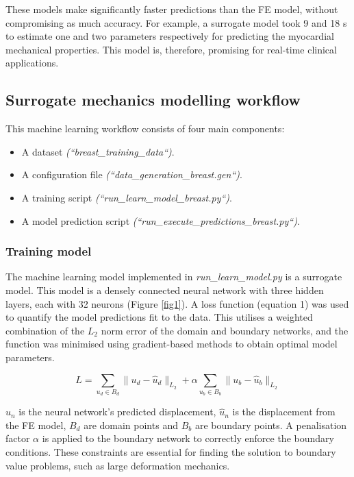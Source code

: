 \documentclass[11pt]{article}
\providecommand{\tightlist}{%
      \setlength{\itemsep}{0pt}\setlength{\parskip}{0pt}}
\begin{document}
 These models make significantly faster predictions than the FE model, without compromising as much accuracy. For example, a surrogate model took 9 and 18 s to estimate one and two parameters respectively for predicting the myocardial mechanical properties. This model is, therefore, promising for real-time clinical applications.

\subsection{Surrogate mechanics modelling workflow}
This machine learning workflow consists of four main components:

\begin{itemize}
\tightlist
\item A dataset \textit{(``breast\_training\_data``)}.
\item A configuration file \textit{(``data\_generation\_breast.gen``)}.
\item A training script \textit{(``run\_learn\_model\_breast.py``)}.
\item A model prediction script \textit{(``run\_execute\_predictions\_breast.py``)}.

\end{itemize}

\subsubsection{Training model}
The machine learning model implemented in \textit{run\_learn\_model.py} is a surrogate model. This model is a densely connected neural network with three hidden layers, each with 32 neurons (Figure \ref{fig1}). A loss function (equation 1) was used to quantify the model predictions fit to the data. This utilises a weighted combination of the $L_{2}$ norm error of the domain and boundary networks, and the function was minimised using gradient-based methods to obtain optimal model parameters.

\begin{equation}
    L = \sum_{u_{d}\in B_{d}}\|u_{d}-\hat{u}_{d}\|_{L_{2}} + \alpha\sum_{u_{b}\in B_{b}}\|u_{b}-\hat{u}_{b}\|_{L_{2}}
\end{equation}

$u_{n}$ is the neural network's predicted displacement, $\hat{u}_{n}$ is the displacement from the FE model, $B_{d}$ are domain points and $B_{b}$ are boundary points. A penalisation factor $\alpha$ is applied to the boundary network to correctly enforce the boundary conditions. These constraints are essential for finding the solution to boundary value problems, such as large deformation mechanics.
\end{document}
